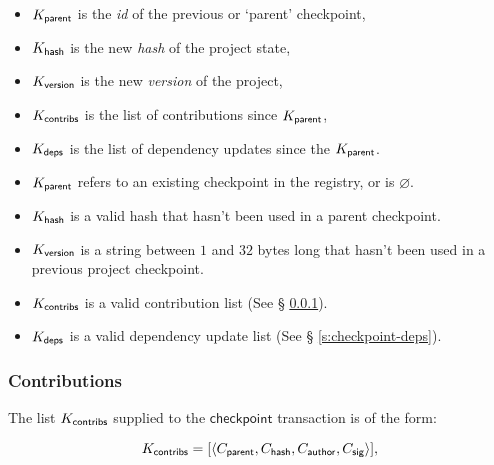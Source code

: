 \begin{itemize}
    \item $K_{\mathsf{parent}}$ is the \emph{id} of the previous or `parent' checkpoint,
    \item $K_{\mathsf{hash}}$ is the new \emph{hash} of the project state,
    \item $K_{\mathsf{version}}$ is the new \emph{version} of the project,
    \item $K_{\mathsf{contribs}}$ is the list of contributions since $K_{\mathsf{parent}}$,
    \item $K_{\mathsf{deps}}$ is the list of dependency updates since the $K_{\mathsf{parent}}$.
\end{itemize}
\validation
\begin{itemize}
    \item{$K_{\mathsf{parent}}$ refers to an existing checkpoint in the registry,
        or is $\varnothing$.}
    \item{$K_{\mathsf{hash}}$ is a valid hash that hasn't been used in a parent
        checkpoint.}
    \item{$K_{\mathsf{version}}$ is a string between $1$ and $32$ bytes long that
        hasn't been used in a previous project checkpoint.}
    \item{$K_{\mathsf{contribs}}$ is a valid contribution list (See \S
        \ref{s:checkpoint-contribs}).}
    \item{$K_{\mathsf{deps}}$ is a valid dependency update list (See \S
        \ref{s:checkpoint-deps}).}
\end{itemize}

\subsubsection{Contributions}
\label{s:checkpoint-contribs}
The list $K_{\mathsf{contribs}}$ supplied to the $\mathsf{checkpoint}$
transaction is of the form:

\[
    K_{\mathsf{contribs}} = [\langle C_{\mathsf{parent}}, C_{\mathsf{hash}},
    C_{\mathsf{author}}, C_{\mathsf{sig}}\rangle],
\]

